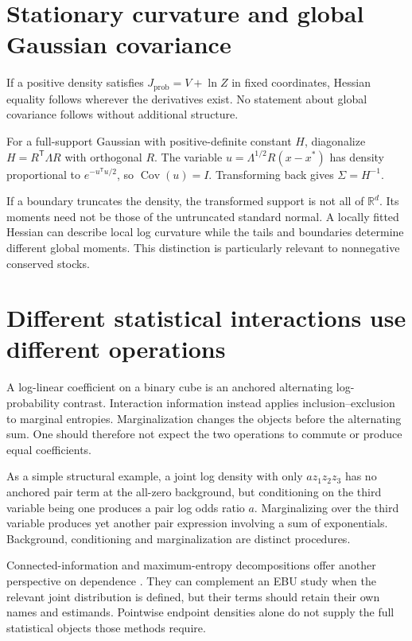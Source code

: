 \section{Stationary curvature and global Gaussian covariance}
If a positive density satisfies $J_{\mathrm{prob}}=V+\ln Z$ in fixed coordinates, Hessian equality follows wherever the derivatives exist. No statement about global covariance follows without additional structure.

For a full-support Gaussian with positive-definite constant $H$, diagonalize $H=R^{\mathsf T}\Lambda R$ with orthogonal $R$. The variable $u=\Lambda^{1/2}R(x-x^*)$ has density proportional to $e^{-u^{\mathsf T}u/2}$, so $\operatorname{Cov}(u)=I$. Transforming back gives $\Sigma=H^{-1}$.

If a boundary truncates the density, the transformed support is not all of $\mathbb R^d$. Its moments need not be those of the untruncated standard normal. A locally fitted Hessian can describe local log curvature while the tails and boundaries determine different global moments. This distinction is particularly relevant to nonnegative conserved stocks.

\section{Different statistical interactions use different operations}
A log-linear coefficient on a binary cube is an anchored alternating log-probability contrast. Interaction information instead applies inclusion--exclusion to marginal entropies. Marginalization changes the objects before the alternating sum. One should therefore not expect the two operations to commute or produce equal coefficients.

As a simple structural example, a joint log density with only $a z_1z_2z_3$ has no anchored pair term at the all-zero background, but conditioning on the third variable being one produces a pair log odds ratio $a$. Marginalizing over the third variable produces yet another pair expression involving a sum of exponentials. Background, conditioning and marginalization are distinct procedures.

Connected-information and maximum-entropy decompositions offer another perspective on dependence \cite{schneidman}. They can complement an EBU study when the relevant joint distribution is defined, but their terms should retain their own names and estimands. Pointwise endpoint densities alone do not supply the full statistical objects those methods require.

